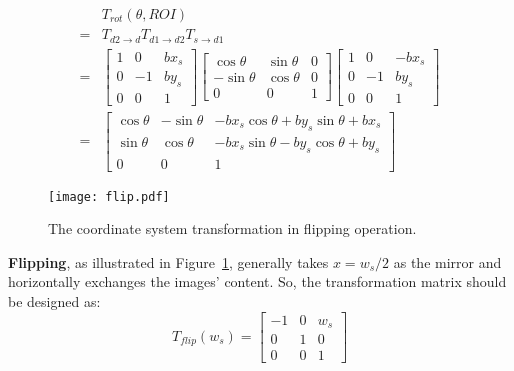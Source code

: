 \documentclass[10pt,journal,compsoc]{IEEEtran}
\begin{document}
\begin{equation}
    \label{eqa:Oo2Oi}
    \begin{split}
     &T_{rot}(\theta,ROI) \\
    =&T_{d2\rightarrow d}T_{d1\rightarrow d2}T_{s\rightarrow d1}\\
    =&\begin{bmatrix} 1  & 0 & bx_s \\
                    0 & -1 & by_s\\
                    0& 0 &1 \end{bmatrix}\begin{bmatrix} \cos\theta  & \sin\theta & 0 \\
                    -\sin\theta & \cos\theta & 0\\
                    0& 0 &1 \end{bmatrix}\begin{bmatrix} 1  & 0 & -bx_s \\
                    0 & -1 & by_s\\
                    0& 0 &1 \end{bmatrix}\\
    =&\begin{bmatrix} \cos\theta  & -\sin\theta & -bx_s\cos\theta+by_s\sin\theta+bx_s \\
                      \sin\theta  &  \cos\theta & -bx_s\sin\theta-by_s\cos\theta+by_s \\
                    0& 0 &1 \end{bmatrix}
    \end{split}
\end{equation}

\begin{figure}[h]
    \centering
    \texttt{[image: flip.pdf]}
    \caption{The coordinate system transformation in flipping operation. }
    \label{fig:flip}
\end{figure}
\textbf{Flipping}, as illustrated in Figure~\ref{fig:flip}, generally takes $x = w_s/2$ as the mirror and horizontally exchanges the images' content. So, the transformation matrix should be designed as:
\begin{equation}
    T_{flip}(w_s) =
    \begin{bmatrix} -1 & 0 & w_s \\
                    0 & 1 & 0 \\
                    0 & 0 &1 \end{bmatrix}
\end{equation}
\end{document}
